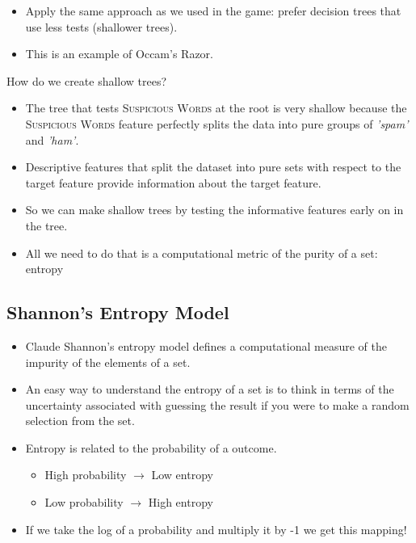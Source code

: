 \documentclass[xcolor={table}]{beamer}
\newcommand{\GW}{\text{\textit{Guess-Who~}}}
\newcommand{\featN}[1]{\textsc{#1}}
\newcommand{\featL}[1]{\textit{'#1'}}
\begin{document}
\begin{frame}
	\begin{itemize}
		\item Apply the same approach as we used in the \GW game: prefer decision trees that use less tests (shallower trees).
		\item This is an example of Occam's Razor.
	\end{itemize}
\end{frame}

\begin{frame}
\begin{alertblock}{How do we create shallow trees?}
	\begin{itemize}
		\item The tree that tests \featN{Suspicious Words} at the root is very shallow because the \featN{Suspicious Words} feature perfectly splits the data into pure groups of \featL{spam} and \featL{ham}.
		\item Descriptive features that split the dataset into pure sets with respect to the target feature provide information about the target feature.
		\item So we can make shallow trees by testing the informative features early on in the tree.
		\item All we need to do that is a computational metric of the purity of a set: \alert{entropy}
	\end{itemize}
\end{alertblock}
\end{frame}

\subsection{Shannon's Entropy Model}

\begin{frame}
	\begin{itemize}
		\item Claude Shannon's entropy model defines a computational measure of the impurity of the elements of a set.
		\item An easy way to understand the entropy of a set is to think in terms of the uncertainty associated with guessing the result if you were to make a random selection from the set.
	\end{itemize}
\end{frame}

\begin{frame}
	\begin{itemize}
		\item Entropy is related to the probability of a outcome.
			\begin{itemize}
				\item High probability $\rightarrow$ Low entropy
				\item Low probability $\rightarrow$ High entropy
			\end{itemize}
		\item If we take the \alert{log} of a probability and multiply it by -1 we get this mapping!
	\end{itemize}
\end{frame}
\end{document}
